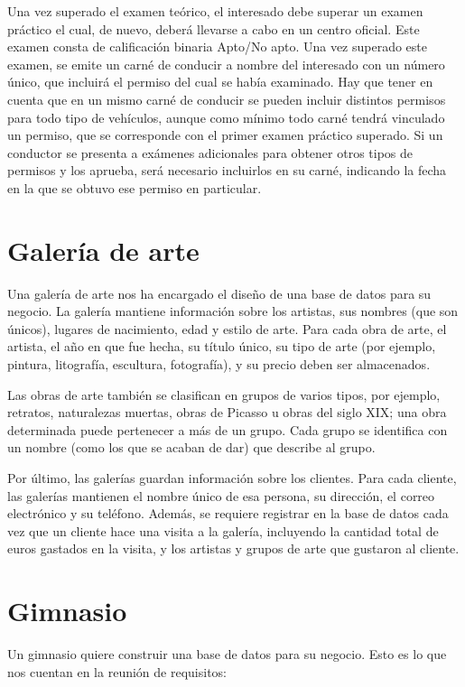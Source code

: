 \documentclass[a4paper]{article}
\begin{document}
Una vez superado el examen teórico, el interesado debe superar un examen práctico el cual, de nuevo, deberá llevarse a cabo en un centro oficial. Este examen consta de calificación binaria Apto/No apto. Una vez superado este examen, se emite un carné de conducir a nombre del interesado con un número único, que incluirá el permiso del cual se había examinado. Hay que tener en cuenta que en un mismo carné de conducir se pueden incluir distintos permisos para todo tipo de vehículos, aunque como mínimo todo carné tendrá vinculado un permiso, que se corresponde con el primer examen práctico superado. Si un conductor se presenta a exámenes adicionales para obtener otros tipos de permisos y los aprueba, será necesario incluirlos en su carné, indicando la fecha en la que se obtuvo ese permiso en particular.

\section{Galería de arte}
Una galería de arte nos ha encargado el diseño de una base de datos para su negocio. La galería mantiene información sobre los artistas, sus nombres (que son únicos), lugares de nacimiento, edad y estilo de arte. Para cada obra de arte, el artista, el año en que fue hecha, su título único, su tipo de arte (por ejemplo, pintura, litografía, escultura, fotografía), y su precio deben ser almacenados. 

Las obras de arte también se clasifican en grupos de varios tipos, por ejemplo, retratos, naturalezas muertas, obras de Picasso u obras del siglo XIX; una obra determinada puede pertenecer a más de un grupo. Cada grupo se identifica con un nombre (como los que se acaban de dar) que describe al grupo. 

Por último, las galerías guardan información sobre los clientes. Para cada cliente, las galerías mantienen el nombre único de esa persona, su dirección, el correo electrónico y su teléfono. Además, se requiere registrar en la base de datos cada vez que un cliente hace una visita a la galería, incluyendo la cantidad total de euros gastados en la visita, y los artistas y grupos de arte que gustaron al cliente.

\section{Gimnasio}
Un gimnasio quiere construir una base de datos para su negocio. Esto es lo que nos cuentan en la reunión de requisitos:
\end{document}
